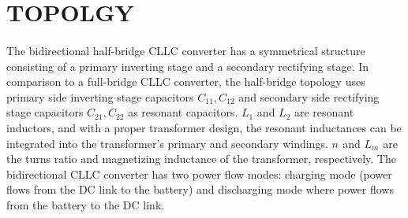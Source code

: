 \documentclass{book}
\begin{document}
\section{TOPOLGY}
 \paragraph{}
 The bidirectional half-bridge CLLC converter has a
symmetrical structure consisting of a primary inverting stage
and a secondary rectifying stage. In comparison to a full-bridge
CLLC converter, the half-bridge topology uses primary side
inverting stage capacitors \( C_{11}, C_{12}  \) and secondary side
rectifying stage capacitors \( C_{21},C_{22}  \) as resonant capacitors.
\( L_{1}  \) and  \( L_{2}  \) are resonant inductors, and with a proper transformer
design, the resonant inductances can be integrated into the
transformer’s primary and secondary windings. \( n_{} \) and \( L_{m} \) are
the turns ratio and magnetizing inductance of the transformer,
respectively. The bidirectional CLLC converter has two power
flow modes: charging mode (power flows from the DC link to
the battery) and discharging mode where power flows from the battery
to the DC link.
\end{document}
